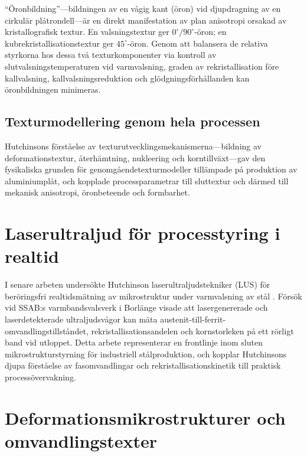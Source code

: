 \documentclass[11pt,a4paper]{article}
\begin{document}
``\"Oronbildning''---bildningen av en v\aa{}gig kant (\"oron) vid
djupdragning av en cirkul\"ar pl\aa{}trondell---\"ar en direkt
manifestation av plan anisotropi orsakad av kristallografisk textur.
En valsningstextur ger $0^\circ/90^\circ$-\"oron; en
kubrekristallisationstextur ger $45^\circ$-\"oron.  Genom att balansera
de relativa styrkorna hos dessa tv\aa{} texturkomponenter via kontroll
av slutvalsningstemperaturen vid varmvalsning, graden av
rekristallisation f\"ore kallvalsning, kallvalsningsreduktion och
gl\"odgningsf\"orh\aa{}llanden kan \"oronbildningen minimeras.

\subsection{Texturmodellering genom hela processen}

Hutchinsons f\"orst\aa{}else av texturutvecklingsmekanismerna---bildning
av deformationstextur, \aa{}terh\"amtning, nukleering och
korntillv\"axt---gav den fysikaliska grunden f\"or
genomg\aa{}endetexturmodeller till\"ampade p\aa{} produktion av
aluminiumpl\aa{}t, och kopplade processparametrar till sluttextur och
d\"armed till mekanisk anisotropi, \"oronbeteende och formbarhet.

\section{Laserultraljud f\"or processtyring i realtid}
\label{sec:lus}

I senare arbeten unders\"okte Hutchinson laserultraljudstekniker (LUS)
f\"or ber\"oringsfri realtidsm\"atning av mikrostruktur under
varmvalsning av st\aa{}l \cite{Hutchinson2011LUS}.  F\"ors\"ok vid
SSAB:s varmbandsvalsverk i Borl\"ange visade att lasergenererade och
laserdetekterade ultraljudsv\aa{}gor kan m\"ata
austenit-till-ferrit-omvandlingstillst\aa{}ndet, rekristallisationsandelen
och kornstorleken p\aa{} ett r\"orligt band vid utloppet.  Detta arbete
representerar en frontlinje inom sluten mikrostrukturstyrning f\"or
industriell st\aa{}lproduktion, och kopplar Hutchinsons djupa f\"orst\aa{}else
av fasomvandlingar och rekristallisationskinetik till praktisk
process\"overvakning.

\section{Deformationsmikrostrukturer och omvandlingstexter}
\label{sec:deformation}
\end{document}
